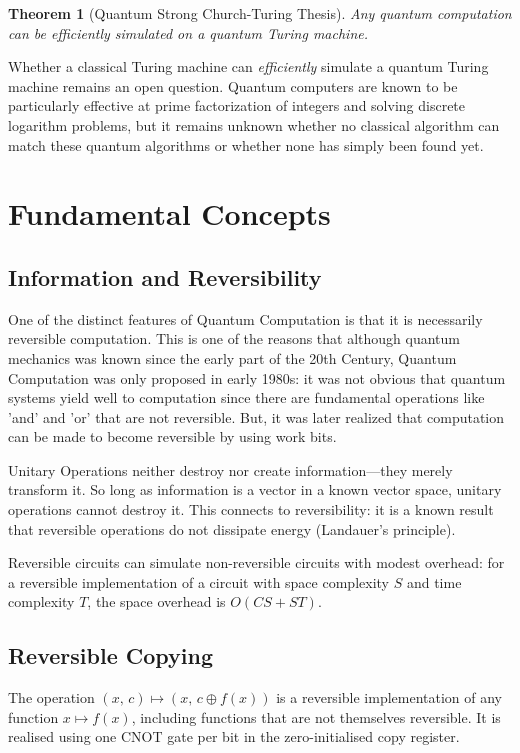 \documentclass[12pt, a4paper, oneside]{report}
\theoremstyle{plain}
\newtheorem{theorem}{Theorem}[chapter]
\theoremstyle{definition}
\theoremstyle{remark}
\begin{document}
\begin{theorem}[Quantum Strong Church-Turing Thesis]
Any quantum computation can be efficiently simulated on a quantum Turing machine.
\end{theorem}

Whether a classical Turing machine can \emph{efficiently} simulate a quantum Turing machine
remains an open question. Quantum computers are known to be particularly effective at prime
factorization of integers and solving discrete logarithm problems, but it remains unknown
whether no classical algorithm can match these quantum algorithms or whether none has simply
been found yet.


\section{Fundamental Concepts}
\label{sec:fundamental}

\subsection{Information and Reversibility}

One of the distinct features of Quantum Computation is that it is necessarily reversible computation. This is one of the reasons that although quantum mechanics was known since the early part of the 20th Century, Quantum Computation was only proposed in early 1980s: it was not obvious that quantum systems yield well to computation since there are fundamental operations like 'and' and 'or' that are not reversible. But, it was later realized that computation can be made to become reversible by using work bits. 

Unitary Operations neither destroy nor create information---they merely transform it. So long as
information is a vector in a known vector space, unitary operations cannot destroy it.
This connects to reversibility: it is a known result that reversible operations do not dissipate energy (Landauer's
principle). 

Reversible circuits can simulate non-reversible circuits with modest overhead:
for a reversible implementation of a circuit with space complexity $S$ and time complexity
$T$, the space overhead is $O(CS + ST)$.

\subsection{Reversible Copying}

The operation $(x,\, c) \mapsto (x,\, c \oplus f(x))$ is a reversible implementation of any
function $x \mapsto f(x)$, including functions that are not themselves reversible. It is
realised using one CNOT gate per bit in the zero-initialised copy register.
\end{document}
